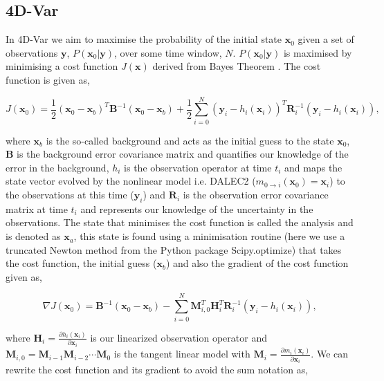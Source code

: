 \documentclass[11pt]{article}
\begin{document}
\subsection{4D-Var} \label{4dvar}

In 4D-Var we aim to maximise the probability of the initial state $\textbf{x}_0$ given a set of observations $\textbf{y}$, $P(\textbf{x}_0|\textbf{y})$, over some time window, $N$. $P(\textbf{x}_0|\textbf{y})$ is maximised by minimising a cost function $J(\textbf{x})$ derived from Bayes Theorem \citep{lewis2006dynamic}. The cost function is given as,

\begin{equation}
J(\textbf{x}_0) = \frac{1}{2}(\textbf{x}_0-\textbf{x}_b)^{T}\textbf{B}^{-1}(\textbf{x}_0-\textbf{x}_b)+\frac{1}{2}\sum_{i=0}^{N}(\textbf{y}_i-h_i(\textbf{x}_i))^{T}\textbf{R}_{i}^{-1}(\textbf{y}_i-h_i(\textbf{x}_i)),
\end{equation}

where $\textbf{x}_b$ is the so-called background and acts as the initial guess to the state $\textbf{x}_0$, $\textbf{B}$ is the background error covariance matrix and quantifies our knowledge of the error in the background, $h_i$ is the observation operator at time $t_i$ and maps the state vector evolved by the nonlinear model i.e. DALEC2 ($m_{0\rightarrow i}(\mathbf{x}_{0})=\textbf{x}_i$) to the observations at this time ($\textbf{y}_i$) and $\textbf{R}_i$ is the observation error covariance matrix at time $t_i$ and represents our knowledge of the uncertainty in the observations. The state that minimises the cost function is called the analysis and is denoted as $\textbf{x}_a$, this state is found using a minimisation routine (here we use a truncated Newton method \citep{Nocedal1999} from the Python package Scipy.optimize) that takes the cost function, the initial guess ($\textbf{x}_b$) and also the gradient of the cost function given as,

\begin{equation}
\nabla J(\textbf{x}_0) = \textbf{B}^{-1}(\textbf{x}_0-\textbf{x}_b)-\sum_{i=0}^{N}\textbf{M}_{i,0}^{T}\textbf{H}_i^{T}\textbf{R}_{i}^{-1}(\textbf{y}_i-h_i(\textbf{x}_i)),
\end{equation}

where $\textbf{H}_i = \frac{\partial h_i(\textbf{x}_i)}{\partial\textbf{x}_i}$ is our linearized observation operator and $\mathbf{M}_{i,0}=\mathbf{M}_{i-1}\mathbf{M}_{i-2}\cdots\mathbf{M}_0$ is the tangent linear model with $\mathbf{M}_i=\frac{\partial m_{i}(\textbf{x}_{i})}{\partial \textbf{x}_{i}}$. We can rewrite the cost function and its gradient to avoid the sum notation as,
\end{document}
